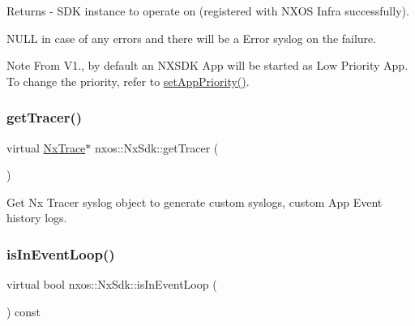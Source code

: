 \begin{DoxyReturn}{Returns}
-\/ S\+DK instance to operate on (registered with N\+X\+OS Infra successfully).
\begin{DoxyItemize}
\item N\+U\+LL in case of any errors and there will be a Error syslog on the failure.
\end{DoxyItemize}
\end{DoxyReturn}
\begin{DoxyNote}{Note}
From V1., by default an N\+X\+S\+DK App will be started as Low Priority App. To change the priority, refer to \mbox{\hyperlink{classnxos_1_1_nx_sdk_a46d9487216506aa19e5499759f5eaef7}{set\+App\+Priority()}}. 
\end{DoxyNote}
\mbox{\label{classnxos_1_1_nx_sdk_ad2c729bd12d1b9f4bf06f4b70fe28347}} 
\subsubsection{\texorpdfstring{get\+Tracer()}{getTracer()}}
{\footnotesize\ttfamily virtual \mbox{\hyperlink{classnxos_1_1_nx_trace}{Nx\+Trace}}$\ast$ nxos\+::\+Nx\+Sdk\+::get\+Tracer (\begin{DoxyParamCaption}{ }\end{DoxyParamCaption})\hspace{0.3cm}{\ttfamily [pure virtual]}}

Get Nx Tracer syslog object to generate custom syslogs, custom App Event history logs. \mbox{\label{classnxos_1_1_nx_sdk_ae2a6d199227de068bda5a720a7f29e94}} 
\subsubsection{\texorpdfstring{is\+In\+Event\+Loop()}{isInEventLoop()}}
{\footnotesize\ttfamily virtual bool nxos\+::\+Nx\+Sdk\+::is\+In\+Event\+Loop (\begin{DoxyParamCaption}{ }\end{DoxyParamCaption}) const\hspace{0.3cm}{\ttfamily [pure virtual]}}

